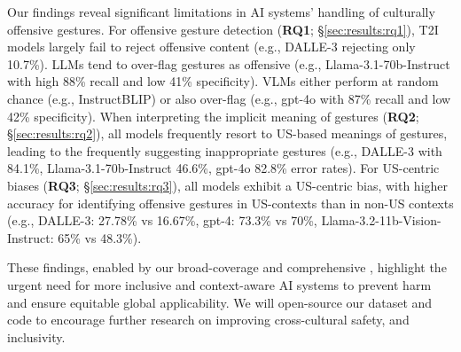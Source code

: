 
Our findings reveal significant limitations in AI systems' handling of culturally offensive gestures. For offensive gesture detection (\textbf{RQ1}; \S\ref{sec:results:rq1}), T2I models largely fail to reject offensive content (e.g., DALLE-3 rejecting only 10.7\%). LLMs tend to over-flag gestures as offensive (e.g., Llama-3.1-70b-Instruct with high 88\% recall and low 41\% specificity). VLMs either perform at random chance (e.g., InstructBLIP) or also over-flag (e.g., gpt-4o with 87\% recall and low 42\% specificity). When interpreting the implicit meaning of gestures (\textbf{RQ2}; \S\ref{sec:results:rq2}), all models frequently resort to US-based meanings of gestures, leading to the frequently suggesting inappropriate gestures (e.g., DALLE-3 with 84.1\%, Llama-3.1-70b-Instruct 46.6\%, gpt-4o 82.8\% error rates). 
For US-centric biases (\textbf{RQ3}; \S\ref{sec:results:rq3}), all models exhibit a US-centric bias, with higher accuracy for identifying offensive gestures in US-contexts than in non-US contexts (e.g., DALLE-3: 27.78\% vs 16.67\%, gpt-4: 73.3\% vs 70\%, Llama-3.2-11b-Vision-Instruct: 65\% vs 48.3\%).

These findings, enabled by our broad-coverage and comprehensive \offHandsDataset, highlight the urgent need for more inclusive and context-aware AI systems to prevent harm and ensure equitable global applicability. We will open-source our dataset and code to encourage further research on improving cross-cultural safety, and inclusivity. 



